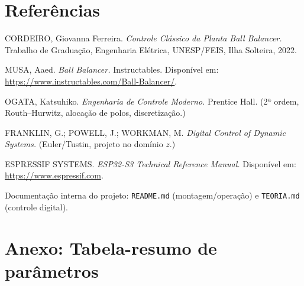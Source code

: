 \documentclass[11pt,a4paper,oneside]{article}
\begin{document}
\section*{Referências}

\begin{enumerate}[label={[\arabic*]}]
  \item CORDEIRO, Giovanna Ferreira. \textit{Controle Clássico da Planta Ball
  Balancer.} Trabalho de Graduação, Engenharia Elétrica, UNESP/FEIS, Ilha
  Solteira, 2022.
  \item MUSA, Aaed. \textit{Ball Balancer.} Instructables. Disponível em:
  \url{https://www.instructables.com/Ball-Balancer/}.
  \item OGATA, Katsuhiko. \textit{Engenharia de Controle Moderno.} Prentice Hall.
  (2ª ordem, Routh–Hurwitz, alocação de polos, discretização.)
  \item FRANKLIN, G.; POWELL, J.; WORKMAN, M. \textit{Digital Control of Dynamic
  Systems.} (Euler/Tustin, projeto no domínio $z$.)
  \item ESPRESSIF SYSTEMS. \textit{ESP32-S3 Technical Reference Manual.}
  Disponível em: \url{https://www.espressif.com}.
  \item Documentação interna do projeto: \texttt{README.md} (montagem/operação) e
  \texttt{TEORIA.md} (controle digital).
\end{enumerate}

\appendix
\section{Anexo: Tabela-resumo de parâmetros}
\end{document}
